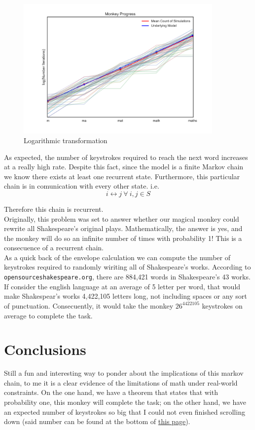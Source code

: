\documentclass{article}
\begin{document}
\begin{figure}[h]
    \centering
    \includegraphics[width=0.90\textwidth]{log_approx}
    \caption{Logarithmic transformation}
\end{figure}


As expected, the number of keystrokes required to reach the next word increases at a really high rate. Despite this fact, since the model is a finite Markov chain we know there exists at least one recurrent state. Furthermore, this particular chain is in comunication with every other state. i.e. $$i \longleftrightarrow j \ \forall \ i,j \in S$$

Therefore this chain is recurrent.\\

Originally, this problem was set to answer whether our magical monkey could rewrite all Shakespeare's original plays. Mathematically, the answer is yes, and the monkey will do so an infinite number of times with probability 1! This is a consecuence of a recurrent chain.\\

As a quick back of the envelope calculation we can compute the number of keystrokes required to randomly wiriting all of Shakespeare's works. According to \texttt{opensourceshakespeare.org}, there are 884,421 words in Shakespeare's 43 works. If consider the english language at an average of 5 letter per word, that would make Shakespear's works 4,422,105 letters long, not including spaces or any sort of punctuation. Consecuently, it would take the monkey $26 ^ {4422105} $ keystrokes on average to complete the task.

\section{Conclusions}
Still a fun and interesting way to ponder about the implications of this markov chain, to me it is a clear evidence of the limitations of math under real-world constraints. On the one hand, we have a theorem that states that with probability one, this monkey will complete the task; on the other hand, we have an expected number of keystrokes so big that I could not even finished scrolling down (said number can be found at the bottom of \href{https://github.com/gerdm/UMA/blob/master/stochastic_processes/final_proyect/monkey_notebook.ipynb}{this page}).\\
\end{document}
